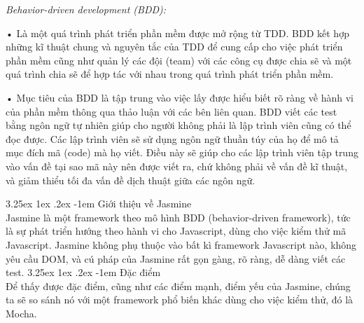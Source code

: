 \documentclass[12pt,a4paper]{article}
\makeatletter
\newcommand{\myparagraph}[1]{\paragraph{#1}\mbox{}\\} %
\renewcommand\paragraph{\@startsection{paragraph}{5}{\z@}%
  {3.25ex \@plus1ex \@minus.2ex}%
  {-1em}%
  {\normalfont\normalsize\bfseries}}
\makeatother
\begin{document}
\textit{Behavior-driven development (BDD):}
\begin{list}{}{}
\item[•] Là một quá trình phát triển phần mềm được mở rộng từ TDD. BDD kết hợp những kĩ thuật chung và nguyên tắc của TDD để cung cấp cho việc phát triển phần mềm cũng như quản lý các đội (team) với các công cụ được chia sẽ và một quá trình chia sẽ để hợp tác với nhau trong quá trình phát triển phần mềm.

\item[•] Mục tiêu của BDD là tập trung vào việc lấy được hiểu biết rõ ràng về hành vi của phần mềm thông qua thảo luận với các bên liên quan. BDD viết các test bằng ngôn ngữ tự nhiên giúp cho người không phải là lập trình viên cũng có thể đọc được. Các lập trình viên sẽ sử dụng ngôn ngữ thuần túy của họ để mô tả mục đích mã (code) mà họ viết. Điều này sẽ giúp cho các lập trình viên tập trung vào vấn đề tại sao mã này nên được viết ra, chứ không phải về vấn đề kĩ thuật, và giảm thiểu tối đa vấn đề dịch thuật giữa các ngôn ngữ.
\end{list}
\myparagraph{Giới thiệu về Jasmine}
Jasmine là một framework theo mô hình BDD (behavior-driven framework), tức là sự phát triển hướng theo hành vi cho Javascript, dùng cho việc kiểm thử mã Javascript. Jasmine không phụ thuộc vào bất kì framework Javascript nào, không yêu cầu DOM, và cú pháp của Jasmine rất gọn gàng, rõ ràng, dễ dàng viết các test.
\myparagraph{Đặc điểm}
Để thấy được đặc điểm, cũng như các điểm mạnh, điểm yếu của Jasmine, chúng ta sẽ so sánh nó với một framework phổ biến khác dùng cho việc kiểm thử, đó là Mocha.
\end{document}
